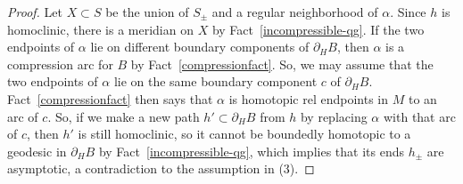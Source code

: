 \documentclass[12pt]{amsart}
\theoremstyle{definition}
\theoremstyle{remark}
\DeclareMathOperator{\length}{length}
\begin{document}
\begin{proof}
Let $X\subset S$ be the union of $S_\pm$ and a regular neighborhood of $\alpha$. Since $h $ is homoclinic, there is a meridian on $X$ by Fact~\ref{incompressible-qg}. If the two endpoints of $\alpha$ lie on different boundary components of $\partial_H B$, then $\alpha$ is a compression arc for $B$ by Fact~\ref{compressionfact}. So, we may assume that the two endpoints of $\alpha$ lie on the same boundary component $c $ of $ \partial_H B$. Fact~\ref{compressionfact} then says that $\alpha$ is homotopic rel endpoints in $M$ to an arc of $c$. So, if we make a new path $h' \subset \partial_H B$ from $h$ by replacing $\alpha$ with that arc of $c$, then $h'$ is still homoclinic, so it cannot be boundedly homotopic to a geodesic in $\partial_H B$ by Fact~\ref{incompressible-qg}, which implies that its ends $h_\pm$ are asymptotic, a contradiction to the assumption in (3).
\end{proof}
%
%
%
\end{document}
